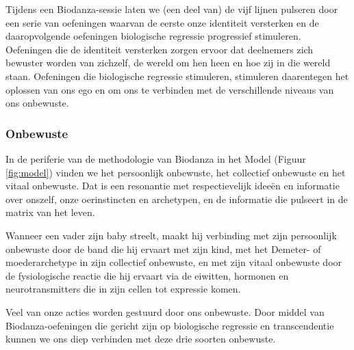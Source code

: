 \documentclass[
  11pt,
]{book}
\begin{document}
Tijdens een Biodanza-sessie laten we (een deel van) de vijf lijnen pulseren door een serie van oefeningen waarvan de eerste onze identiteit versterken en de daaropvolgende oefeningen biologische regressie progressief stimuleren. Oefeningen die de identiteit versterken zorgen ervoor dat deelnemers zich bewuster worden van zichzelf, de wereld om hen heen en hoe zij in die wereld staan. Oefeningen die biologische regressie stimuleren, stimuleren daarentegen het oplossen van ons ego en om ons te verbinden met de verschillende niveaus van ons onbewuste.

\hypertarget{onbewuste}{%
\subsubsection{Onbewuste}\label{onbewuste}}

In de periferie van de methodologie van Biodanza in het Model (Figuur \ref{fig:model}) vinden we het persoonlijk onbewuste, het collectief onbewuste en het vitaal onbewuste. Dat is een resonantie met respectievelijk ideeën en informatie over onszelf, onze oerinstincten en archetypen, en de informatie die pulseert in de matrix van het leven.

Wanneer een vader zijn baby streelt, maakt hij verbinding met zijn persoonlijk onbewuste door de band die hij ervaart met zijn kind, met het Demeter- of moederarchetype in zijn collectief onbewuste, en met zijn vitaal onbewuste door de fysiologische reactie die hij ervaart via de eiwitten, hormonen en neurotransmitters die in zijn cellen tot expressie komen.

Veel van onze acties worden gestuurd door ons onbewuste. Door middel van Biodanza-oefeningen die gericht zijn op biologische regressie en transcendentie kunnen we ons diep verbinden met deze drie soorten onbewuste.
\end{document}
